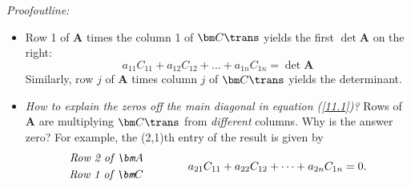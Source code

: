 \emph{Proofoutline:} 
\begin{itemize}
\item
Row 1 of $\bm A$ times the column 1 of $\bm C\trans$ yields the first $\det\bm A$ on the right:
\[
a_{11}C_{11}+a_{12}C_{12}+\dots+a_{1n}C_{1n}=\det\bm A
\]
Similarly, row $j$ of $\bm A$ times column $j$ of $\bm C\trans$ yields the determinant.
\item
\textit{How to explain the zeros off the main diagonal in equation (\ref{11.1})?} Rows of $\bm A$ are multiplying $\bm C\trans$ from \emph{different} columns. Why is the answer zero? For example, the (2,1)th entry of the result is given by
\begin{equation}
\begin{aligned}
\text{\emph{Row 2 of $\bm A$}}\\
\text{\emph{Row 1 of $\bm C$}}
\end{aligned}
\qquad\qquad
a_{21}C_{11}+a_{22}C_{12}+\dots+a_{2n}C_{1n}=0.\label{Eq:6:2}
\end{equation}


\end{itemize}
